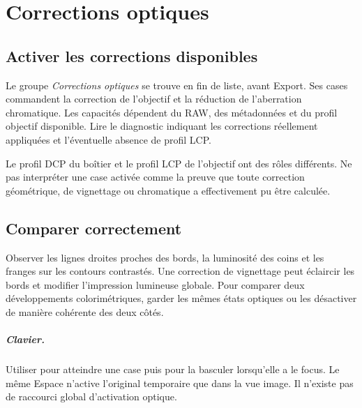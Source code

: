 \chapter{Corrections optiques}
\section{Activer les corrections disponibles}
Le groupe \emph{Corrections optiques} se trouve en fin de liste, avant Export.
Ses cases commandent la correction de l’objectif et la réduction de l’aberration
chromatique. Les capacités dépendent du RAW, des métadonnées et du profil
objectif disponible. Lire le diagnostic indiquant les corrections réellement
appliquées et l’éventuelle absence de profil LCP.

Le profil DCP du boîtier et le profil LCP de l’objectif ont des rôles différents.
Ne pas interpréter une case activée comme la preuve que toute correction
géométrique, de vignettage ou chromatique a effectivement pu être calculée.

\section{Comparer correctement}
Observer les lignes droites proches des bords, la luminosité des coins et
les franges sur les contours contrastés. Une correction de vignettage peut
éclaircir les bords et modifier l’impression lumineuse globale.
Pour comparer deux développements colorimétriques, garder les mêmes états
optiques ou les désactiver de manière cohérente des deux côtés.

\paragraph{Clavier.}
Utiliser  pour atteindre une case puis  pour la
basculer lorsqu’elle a le focus. Le même Espace n’active l’original temporaire
que dans la vue image. Il n’existe pas de raccourci global d’activation optique.
